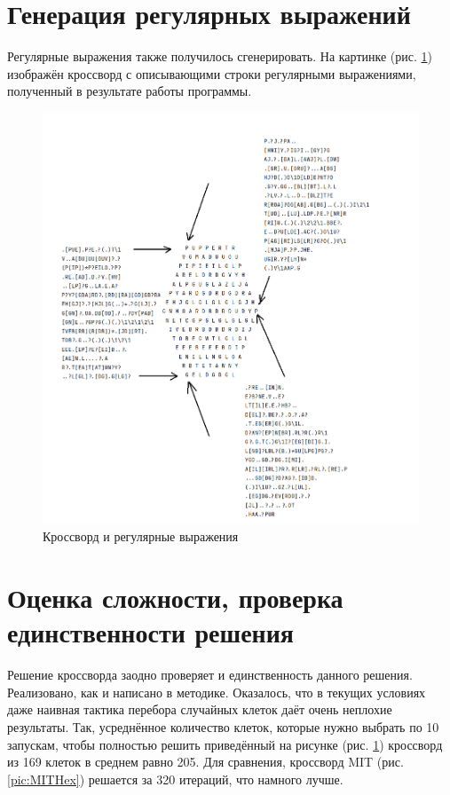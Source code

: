 \documentclass[12pt]{report}
\begin{document}
\section{Генерация регулярных выражений} Регулярные выражения также получилось сгенерировать. На картинке (рис. \ref{pic:CrossWithRegexps}) изображён кроссворд с описывающими строки регулярными выражениями, полученный в результате работы программы.
\begin{figure}[p!]
 \centering
    \includegraphics[scale=0.8]{generated9.png}
    \caption{\label{pic:CrossWithRegexps} Кроссворд и регулярные выражения}
\end{figure}

\section{Оценка сложности, проверка единственности решения} Решение кроссворда заодно проверяет и единственность данного решения. Реализовано, как и написано в методике. Оказалось, что в текущих условиях даже наивная тактика перебора случайных клеток даёт очень неплохие результаты. Так, усреднённое количество клеток, которые нужно выбрать по 10 запускам, чтобы полностью решить приведённый на рисунке (рис. \ref{pic:CrossWithRegexps}) кроссворд из 169 клеток в среднем равно 205. Для сравнения, кроссворд MIT (рис. \ref{pic:MITHex}) решается за 320 итераций, что намного лучше.
\end{document}
